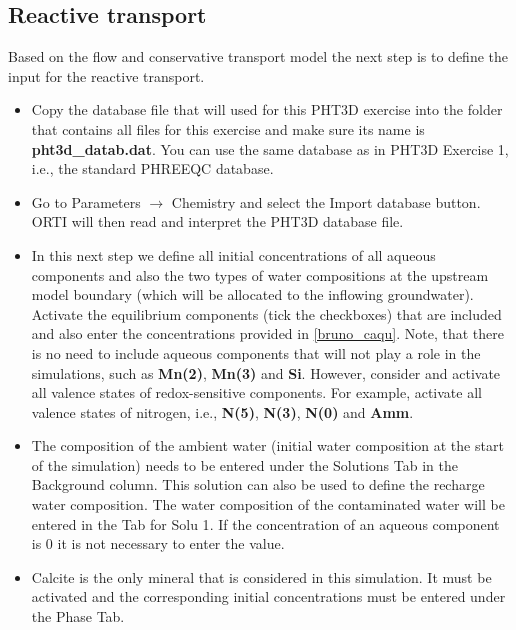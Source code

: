 \subsection[Reactive transport]{Reactive transport}

Based on the flow and conservative transport model the next step is to define 
the input for the reactive transport.

\begin{itemize}

\item Copy the database file that will used for this PHT3D exercise
into the folder that contains all files for this exercise and make sure
its name is {\color{red} \textbf{pht3d\_datab.dat}}.
You can use the same database as in PHT3D Exercise 1, i.e., the standard PHREEQC database.

\item Go to {\color{blue}Parameters} $\rightarrow$ {\color{blue}Chemistry} and select the
{\color{blue}Import database} button. ORTI will then read and interpret 
the PHT3D database file.

\item In this next step we define all initial concentrations of all aqueous components and 
also the two types of water compositions at the upstream model boundary 
(which will be allocated to the inflowing groundwater). 
Activate the equilibrium components (tick the checkboxes) that are included
and also enter the concentrations provided in \ref{bruno_caqu}. 
Note, that there is no need to include aqueous components that will not play a role
in the simulations, such as {\color{red} \textbf{Mn(2)}}, {\color{red} \textbf{Mn(3)}} and  {\color{red} \textbf{Si}}. However, consider and activate all valence
states of redox-sensitive components. For example, activate all valence states of nitrogen,
i.e., {\color{red} \textbf{N(5)}}, {\color{red} \textbf{N(3)}}, {\color{red} \textbf{N(0)}} and {\color{red} \textbf{Amm}}. 

\item The composition of the ambient water (initial water composition at the start of the simulation) 
needs to be entered under the {\color{blue}Solutions} Tab 
in the {\color{blue}Background} column.
This solution can also be used to define the recharge water composition.
The water composition of the contaminated water will be entered in the 
Tab for {\color{blue}Solu 1}. If the concentration of
an aqueous component is 0 it is not necessary to enter the value.

\item Calcite is the only mineral that is considered in this simulation.
It must be activated and the corresponding initial concentrations must be entered 
under the {\color{blue}Phase} Tab.


\end{itemize}
